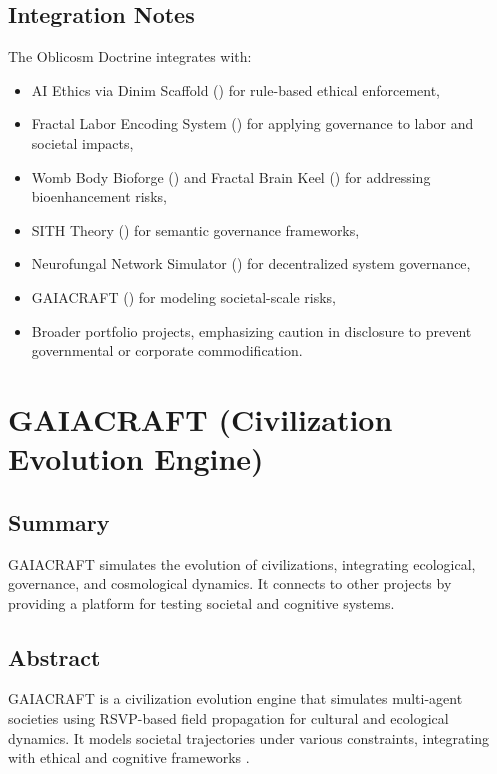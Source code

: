 \documentclass[11pt,oneside]{memoir}
\theoremstyle{plain}
\begin{document}
\section{Integration Notes}
The Oblicosm Doctrine integrates with:
\begin{itemize}
    \item AI Ethics via Dinim Scaffold () for rule-based ethical enforcement,
    \item Fractal Labor Encoding System () for applying governance to labor and societal impacts,
    \item Womb Body Bioforge () and Fractal Brain Keel () for addressing bioenhancement risks,
    \item SITH Theory () for semantic governance frameworks,
    \item Neurofungal Network Simulator () for decentralized system governance,
    \item GAIACRAFT () for modeling societal-scale risks,
    \item Broader portfolio projects, emphasizing caution in disclosure to prevent governmental or corporate commodification.
\end{itemize}

\chapter{GAIACRAFT (Civilization Evolution Engine)}
\label{sec:gaiacraft}

\section{Summary}
GAIACRAFT simulates the evolution of civilizations, integrating ecological, governance, and cosmological dynamics. It connects to other projects by providing a platform for testing societal and cognitive systems.

\section{Abstract}
GAIACRAFT is a civilization evolution engine that simulates multi-agent societies using RSVP-based field propagation for cultural and ecological dynamics. It models societal trajectories under various constraints, integrating with ethical and cognitive frameworks \cite{ai_ethics}.
\end{document}
